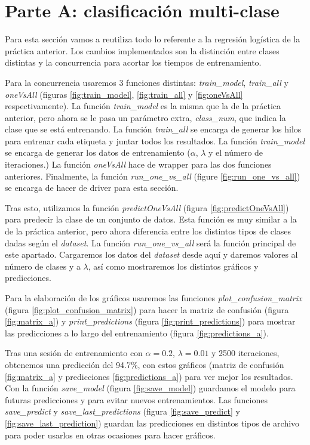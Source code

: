 \documentclass[6pt]{AiTex}
\begin{document}
\section{Parte A: clasificación multi-clase}

Para esta sección vamos a reutiliza todo lo referente a la regresión logística de la práctica anterior. Los cambios implementados son la distinción entre clases distintas y la concurrencia para acortar los tiempos de entrenamiento.

Para la concurrencia usaremos 3 funciones distintas: \textit{train\_model}, \textit{train\_all} y \textit{oneVsAll} (figuras \ref{fig:train_model}, \ref{fig:train_all} y \ref{fig:oneVsAll} respectivamente). La función \textit{train\_model} es la misma que la de la práctica anterior, pero ahora se le pasa un parámetro extra, \textit{class\_num}, que indica la clase que se está entrenando. La función \textit{train\_all} se encarga de generar los hilos para entrenar cada etiqueta y juntar todos los resultados. La función \textit{train\_model} se encarga de generar los datos de entrenamiento ($\alpha$, $\lambda$ y el número de iteraciones.) La función \textit{oneVsAll} hace de wrapper para las dos funciones anteriores. Finalmente, la función \textit{run\_one\_vs\_all} (figure \ref{fig:run_one_vs_all}) se encarga de hacer de driver para esta sección.

Tras esto, utilizamos la función \textit{predictOneVsAll} (figura \ref{fig:predictOneVsAll}) para predecir la clase de un conjunto de datos. Esta función es muy similar a la de la práctica anterior, pero ahora diferencia entre los distintos tipos de clases dadas según el \textit{dataset}. La función \textit{run\_one\_vs\_all} será la función principal de este apartado. Cargaremos los datos del \textit{dataset} desde aquí y daremos valores al número de clases y a $\lambda$, así como mostraremos los distintos gráficos y predicciones.

Para la elaboración de los gráficos usaremos las funciones \textit{plot\_confusion\_matrix} (figura \ref{fig:plot_confusion_matrix}) para hacer la matriz de confusión (figura \ref{fig:matrix_a}) y \textit{print\_predictions} (figura \ref{fig:print_predictions}) para mostrar las predicciones a lo largo del entrenamiento (figura \ref{fig:predictions_a}).

Tras una sesión de entrenamiento con $\alpha = 0.2$, $\lambda = 0.01$ y 2500 iteraciones, obtenemos una predicción del 94.7\%, con estos gráficos (matriz de confusión \ref{fig:matrix_a} y predicciones \ref{fig:predictions_a}) para ver mejor los resultados. Con la función \textit{save\_model} (figura \ref{fig:save_model}) guardamos el modelo para futuras predicciones y para evitar nuevos entrenamientos. Las funciones \textit{save\_predict} y \textit{save\_last\_predictions} (figura \ref{fig:save_predict} y \ref{fig:save_last_prediction}) guardan las predicciones en distintos tipos de archivo para poder usarlos en otras ocasiones para hacer gráficos.
\end{document}
